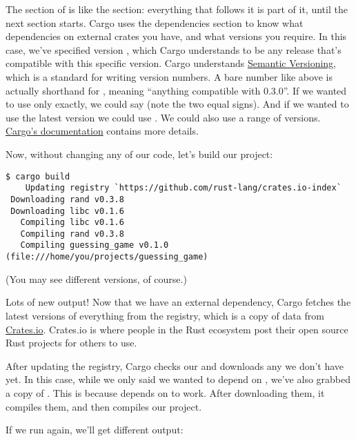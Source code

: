The \code{[dependencies]} section of  is like the \code{[package]} section: everything that follows it is part 
of it, until the next section starts. Cargo uses the dependencies section to know what dependencies on external crates you have, 
and what versions you require. In this case, we’ve specified version , which Cargo understands to be any release that’s
compatible with this specific version. Cargo understands \href{http://semver.org/}{Semantic Versioning}, which is a standard for
writing version numbers. A bare number like above is actually shorthand for , meaning \enquote{anything compatible 
with 0.3.0}. If we wanted to use only  exactly, we could say  (note the two equal signs). And if we
wanted to use the latest version we could use \code{*}. We could also use a range of versions. 
\href{http://doc.crates.io/crates-io.html}{Cargo’s documentation} contains more details.

\blank

Now, without changing any of our code, let’s build our project:

\begin{verbatim}
$ cargo build
    Updating registry `https://github.com/rust-lang/crates.io-index`
 Downloading rand v0.3.8
 Downloading libc v0.1.6
   Compiling libc v0.1.6
   Compiling rand v0.3.8
   Compiling guessing_game v0.1.0 (file:///home/you/projects/guessing_game)

\end{verbatim}

(You may see different versions, of course.)

\blank

Lots of new output! Now that we have an external dependency, Cargo fetches the latest versions of everything from the registry, 
which is a copy of data from \href{https://crates.io/}{Crates.io}. Crates.io is where people in the Rust ecosystem post their 
open source Rust projects for others to use.

\blank

After updating the registry, Cargo checks our \code{[dependencies]} and downloads any we don’t have yet. In this case, while we 
only said we wanted to depend on , we’ve also grabbed a copy of . This is because  depends on 
 to work. After downloading them, it compiles them, and then compiles our project.

\blank

If we run  again, we’ll get different output:

